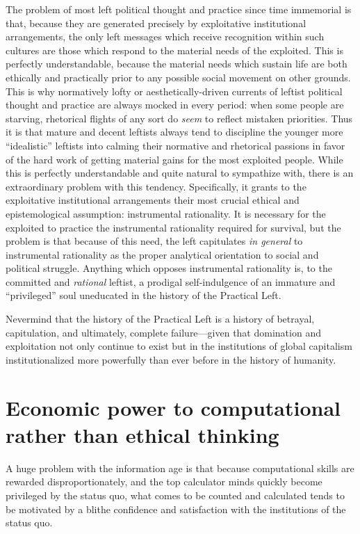 \documentclass[12pt,book]{article}
\begin{document}
The problem of most left political thought and practice since time
immemorial is that, because they are generated precisely by exploitative
institutional arrangements, the only left messages which receive
recognition within such cultures are those which respond to the material
needs of the exploited. This is perfectly understandable, because the
material needs which sustain life are both ethically and practically
prior to any possible social movement on other grounds. This is why
normatively lofty or aesthetically-driven currents of leftist political
thought and practice are always mocked in every period: when some people
are starving, rhetorical flights of any sort do \emph{seem} to reflect
mistaken priorities. Thus it is that mature and decent leftists always
tend to discipline the younger more ``idealistic'' leftists into calming
their normative and rhetorical passions in favor of the hard work of
getting material gains for the most exploited people. While this is
perfectly understandable and quite natural to sympathize with, there is
an extraordinary problem with this tendency. Specifically, it grants to
the exploitative institutional arrangements their most crucial ethical
and epistemological assumption: instrumental rationality. It is
necessary for the exploited to practice the instrumental rationality
required for survival, but the problem is that because of this need, the
left capitulates \emph{in general} to instrumental rationality as the
proper analytical orientation to social and political struggle. Anything
which opposes instrumental rationality is, to the committed and
\emph{rational} leftist, a prodigal self-indulgence of an immature and
``privileged'' soul uneducated in the history of the Practical Left.

Nevermind that the history of the Practical Left is a history of
betrayal, capitulation, and ultimately, complete failure---given that
domination and exploitation not only continue to exist but in the
institutions of global capitalism institutionalized more powerfully than
ever before in the history of humanity.

\section{Economic power to computational rather than ethical
thinking}\label{economic-power-to-computational-rather-than-ethical-thinking}

A huge problem with the information age is that because computational
skills are rewarded disproportionately, and the top calculator minds
quickly become privileged by the status quo, what comes to be counted
and calculated tends to be motivated by a blithe confidence and
satisfaction with the institutions of the status quo.
\end{document}
